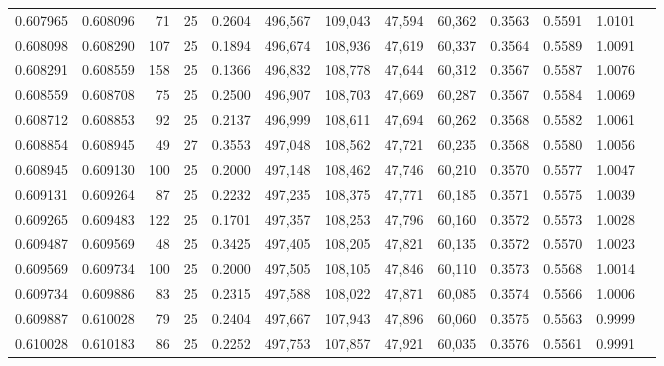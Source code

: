 \begin{tabular}{rrrrrrrrrrrrr}
0.607965 & 0.608096 &    71 &  25 &                                     0.2604 & 496,567 & 109,043 &  47,594 &  60,362 & 0.3563 & 0.5591 & 1.0101 \\
0.608098 & 0.608290 &   107 &  25 &                                     0.1894 & 496,674 & 108,936 &  47,619 &  60,337 & 0.3564 & 0.5589 & 1.0091 \\
0.608291 & 0.608559 &   158 &  25 &                                     0.1366 & 496,832 & 108,778 &  47,644 &  60,312 & 0.3567 & 0.5587 & 1.0076 \\
0.608559 & 0.608708 &    75 &  25 &                                     0.2500 & 496,907 & 108,703 &  47,669 &  60,287 & 0.3567 & 0.5584 & 1.0069 \\
0.608712 & 0.608853 &    92 &  25 &                                     0.2137 & 496,999 & 108,611 &  47,694 &  60,262 & 0.3568 & 0.5582 & 1.0061 \\
0.608854 & 0.608945 &    49 &  27 &                                     0.3553 & 497,048 & 108,562 &  47,721 &  60,235 & 0.3568 & 0.5580 & 1.0056 \\
0.608945 & 0.609130 &   100 &  25 &                                     0.2000 & 497,148 & 108,462 &  47,746 &  60,210 & 0.3570 & 0.5577 & 1.0047 \\
0.609131 & 0.609264 &    87 &  25 &                                     0.2232 & 497,235 & 108,375 &  47,771 &  60,185 & 0.3571 & 0.5575 & 1.0039 \\
0.609265 & 0.609483 &   122 &  25 &                                     0.1701 & 497,357 & 108,253 &  47,796 &  60,160 & 0.3572 & 0.5573 & 1.0028 \\
0.609487 & 0.609569 &    48 &  25 &                                     0.3425 & 497,405 & 108,205 &  47,821 &  60,135 & 0.3572 & 0.5570 & 1.0023 \\
0.609569 & 0.609734 &   100 &  25 &                                     0.2000 & 497,505 & 108,105 &  47,846 &  60,110 & 0.3573 & 0.5568 & 1.0014 \\
0.609734 & 0.609886 &    83 &  25 &                                     0.2315 & 497,588 & 108,022 &  47,871 &  60,085 & 0.3574 & 0.5566 & 1.0006 \\
0.609887 & 0.610028 &    79 &  25 &                                     0.2404 & 497,667 & 107,943 &  47,896 &  60,060 & 0.3575 & 0.5563 & 0.9999 \\
0.610028 & 0.610183 &    86 &  25 &                                     0.2252 & 497,753 & 107,857 &  47,921 &  60,035 & 0.3576 & 0.5561 & 0.9991 \\

\end{tabular}
